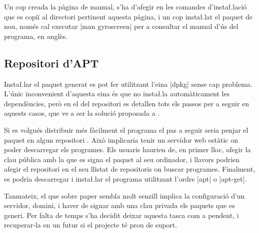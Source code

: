 Un cop creada la pàgina de manual, s'ha d'afegir en les comandes d'insta\l.lació
que es copiï al directori pertinent aquesta pàgina, i un cop insta\l.lat el
paquet de nou, només cal executar \ord|man gyroscreen| per a consultar el
manual d'ús del programa, en anglès.

\subsection{Repositori d'APT}

Insta\l.lar el paquet generat es pot fer utilitzant l'eina \ord|dpkg| sense cap
problema. L'únic inconvenient d'aquesta eina és que no insta\l.la automàticament
les dependències, però en el  del repositori es detallen tots els
passos per a seguir en aquests casos, que ve a ser la solució proposada a
\cite{dpkgHelp}.

Si es volgués distribuir més fàcilment el programa el pas a seguir seria
penjar el paquet en algun repositori . Això implicaria tenir un servidor
web estàtic on poder descarregar els programes. Els usuaris haurien de, en primer
lloc, afegir la clau pública amb la que es signa el paquet al seu ordinador, i
llavors podrien afegir el repositori  en el seu llistat de repositoris
on buscar programes. Finalment, es podria descarregar i insta\l.lar el programa
utilitzant l'ordre \ord|apt| o \ord|apt-get|.

Tanmateix, el que sobre paper sembla molt senzill implica la configuració d'un
servidor, domini, i haver de signar amb una clau privada els paquets que es
generi. Per falta de temps s'ha decidit deixar aquesta tasca com a pendent, i
recuperar-la en un futur si el projecte té prou de suport.
